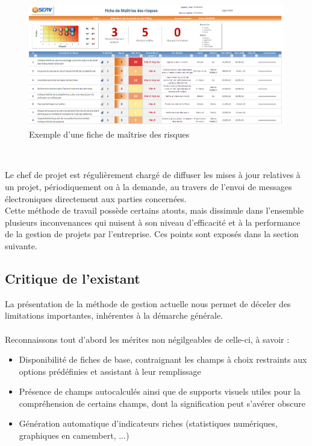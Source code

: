 \begin{spacing}{1.5}
\begin{figure}[H]
\centering
\includegraphics[width=\linewidth]{ficheRisques.png}
\caption{Exemple d'une fiche de maîtrise des risques}
\label{fig:risqueFiche}
\end{figure}
\

Le chef de projet est régulièrement chargé de diffuser les mises à jour relatives à un projet, périodiquement ou à la demande, au travers de l'envoi de messages électroniques directement aux parties concernées.\\

Cette méthode de travail possède certains atouts, mais dissimule dans l'ensemble plusieurs inconvenances qui nuisent à son niveau d'efficacité et à la performance de la gestion de projets par l'entreprise. Ces points sont exposés dans la section suivante.

\subsection{Critique de l'existant}
La présentation de la méthode de gestion actuelle nous permet de déceler des limitations importantes, inhérentes à la démarche générale.\\
\\
Reconnaissons tout d'abord les mérites non négilgeables de celle-ci, à savoir :
\begin{itemize}
    \item Disponibilité de fiches de base, contraignant les champs à choix restraints aux options prédéfinies et assistant à leur remplissage
    \item Présence de champs autocalculés ainsi que de supports visuels utiles pour la compréhension de certains champs, dont la signification peut s'avérer obscure
    \item Génération automatique d'indicateurs riches (statistiques numériques, graphiques en camembert, ...)
\end{itemize}
\


\end{spacing}
